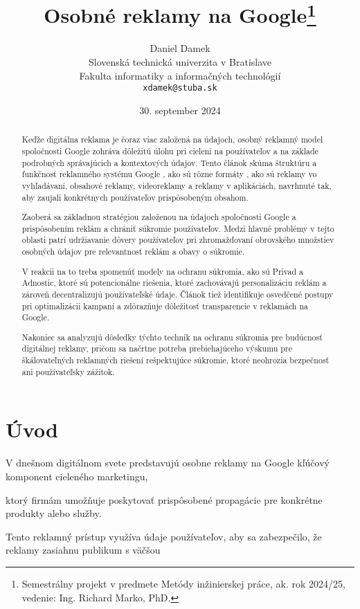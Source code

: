 \documentclass[10pt,slovak,a4paper]{article}
\title{Osobné reklamy na Google\thanks{Semestrálny projekt v predmete Metódy inžinierskej práce, ak. rok 2024/25, vedenie: Ing. Richard Marko, PhD.}} %
\author{Daniel Damek\\[2pt]
	{\small Slovenská technická univerzita v Bratislave}\\
	{\small Fakulta informatiky a informačných technológií}\\
	{\small \texttt{xdamek@stuba.sk}}
	}
\date{\small 30. september 2024} %
\begin{document}
\maketitle

\begin{abstract}
Keďže digitálna reklama je čoraz viac založená na údajoch, osobný reklamný model spoločnosti Google zohráva dôležitú úlohu pri cielení na používateľov a na základe podrobných správajúcich a kontextových údajov. Tento článok skúma štruktúru a funkčnosť reklamného systému Google , ako sú rôzne formáty , ako sú reklamy vo vyhľadávaní, obsahové reklamy, videoreklamy a reklamy v aplikáciách, navrhnuté tak, aby zaujali konkrétnych používateľov prispôsobeným obsahom. 

Zaoberá sa základnou stratégiou založenou na údajoch spoločnosti Google a prispôsobením reklám a chrániť súkromie používateľov. Medzi hlavné problémy v tejto oblasti patrí udržiavanie dôvery používateľov pri zhromažďovaní obrovského množstiev osobných údajov pre relevantnosť reklám a obavy o súkromie.   

V reakcii na to treba spomenúť modely na ochranu súkromia, ako sú Privad a Adnostic, ktoré sú potencionálne riešenia, ktoré zachovávajú personalizáciu reklám a zároveň decentralizujú používateľské údaje. Článok tiež identifikuje osvedčené postupy pri optimalizácii kampaní a zdôrazňuje dôležitosť transparencie v reklamách na Google.  

Nakoniec sa analyzujú dôsledky týchto techník na ochranu súkromia pre budúcnosť digitálnej reklamy, pričom sa načrtne  potreba prebiehajúceho výskumu pre škálovateľných reklamných riešení rešpektujúce súkromie, ktoré neohrozia bezpečnosť ani používateľsky zážitok. 

\end{abstract}





\section{Úvod}
V dnešnom digitálnom svete predstavujú osobne reklamy na Google kľúčový komponent cieleného marketingu,  

ktorý firmám umožňuje poskytovať prispôsobené propagácie pre konkrétne produkty alebo služby.  

Tento reklamný prístup využíva údaje používateľov, aby sa zabezpečilo, že reklamy zasiahnu publikum s väčšou  
\end{document}
